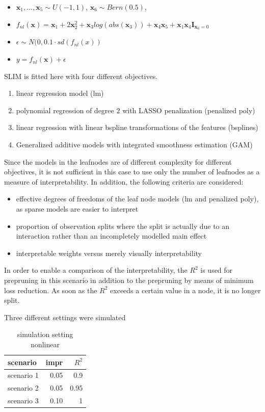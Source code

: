 \begin{itemize}
    \item $\textbf{x}_1, ..., \textbf{x}_5 \sim U(-1,1)$, $\textbf{x}_6 \sim Bern(0.5)$, 
    \item $ f_{nl}(\textbf{x}) = \textbf{x}_1 + 2 \textbf{x}_2^2 + \textbf{x}_3log(abs(\textbf{x}_3)) + \textbf{x}_4\textbf{x}_5 + \textbf{x}_1\textbf{x}_4\mathbf{I}_{\textbf{x}_6 = 0}$
    \item $\epsilon \sim N(0,  0.1 \cdot sd(f_{nl}(x))$
    \item $y = f_{nl}(\textbf{x}) + \epsilon$     
\end{itemize}

SLIM is fitted here with four different objectives.
\begin{enumerate}
    \item linear regression model (lm)
    \item polynomial regression of degree $2$ with LASSO penalization (penalized poly)
    \item linear regression with linear bspline transformations of the features (bsplines)
    \item Generalized additive models with integrated smoothness estimation \citep{Wood.2011} (GAM)
\end{enumerate}


Since the models in the leafnodes are of different complexity for different objectives, it is not sufficient in this case to use only the number of leafnodes as a measure of interpretability. In addition, the following criteria are considered:
\begin{itemize}
    \item effective degrees of freedoms of the leaf node models (lm and penalized poly), as sparse models are easier to interpret
    \item proportion of observation splits where the split is actually due to an interaction rather than an incompletely modelled main effect
    \item interpretable weights versus merely visually interpretability
\end{itemize}

In order to enable a comparison of the interpretability, the $R^2$ is used for prepruning in this scenario in addition to the prepruning by means of minimum loss reduction. As soon as the $R^2$ exceeds a certain value in a node, it is no longer split. 

Three different settings were simulated
\begin{table}[!htt]
    \centering
    \begin{tabular}{l|r|r}
        \hline
        scenario  &  impr & $R^2$ \\
        \hline
        scenario 1 & 0.05 & 0.9 \\
        scenario 2 & 0.05 & 0.95 \\
        scenario 3 & 0.10 & 1  \\
        \hline

    \end{tabular}
    \caption{simulation setting nonlinear}
    \label{tab:}
\end{table}

